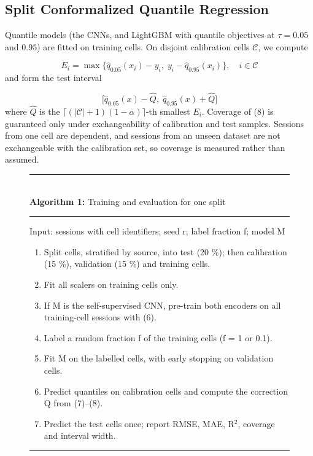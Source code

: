 \documentclass[journal]{IEEEtran}
\begin{document}
\subsection{Split Conformalized Quantile Regression}
Quantile models (the CNNs, and LightGBM with quantile objectives at \(\tau=0.05\) and \(0.95\)) are fitted on training cells. On disjoint calibration cells \(\mathcal{C}\), we compute \cite{b17}

\begin{equation}
E_i=\max\{\hat{q}_{0.05}(x_i)-y_i,\;y_i-\hat{q}_{0.95}(x_i)\},\quad i\in\mathcal{C}
\label{eq:7}
\end{equation}
and form the test interval

\begin{equation}
\big[\hat{q}_{0.05}(x)-\hat{Q},\;\hat{q}_{0.95}(x)+\hat{Q}\big]
\label{eq:8}
\end{equation}
where \(\hat{Q}\) is the \(\lceil(|\mathcal{C}|+1)(1-\alpha)\rceil\)-th smallest \(E_i\). Coverage of (8) is guaranteed only under exchangeability of calibration and test samples. Sessions from one cell are dependent, and sessions from an unseen dataset are not exchangeable with the calibration set, so coverage is measured rather than assumed.

\begin{figure}[!t]
\footnotesize
\noindent\rule{\columnwidth}{0.6pt}\\
\textbf{Algorithm 1:} Training and evaluation for one split\\[-2pt]
\noindent\rule{\columnwidth}{0.4pt}
Input: sessions with cell identifiers; seed r; label fraction f; model M\\
\begin{enumerate}[leftmargin=*,nosep]
\item Split cells, stratified by source, into test (20 \%); then calibration (15 \%), validation (15 \%) and training cells.
\item Fit all scalers on training cells only.
\item If M is the self-supervised CNN, pre-train both encoders on all training-cell sessions with (6).
\item Label a random fraction f of the training cells (f = 1 or 0.1).
\item Fit M on the labelled cells, with early stopping on validation cells.
\item Predict quantiles on calibration cells and compute the correction Q from (7)--(8).
\item Predict the test cells once; report RMSE, MAE, R$^2$, coverage and interval width.
\end{enumerate}
\noindent\rule{\columnwidth}{0.6pt}
\end{figure}
\end{document}
